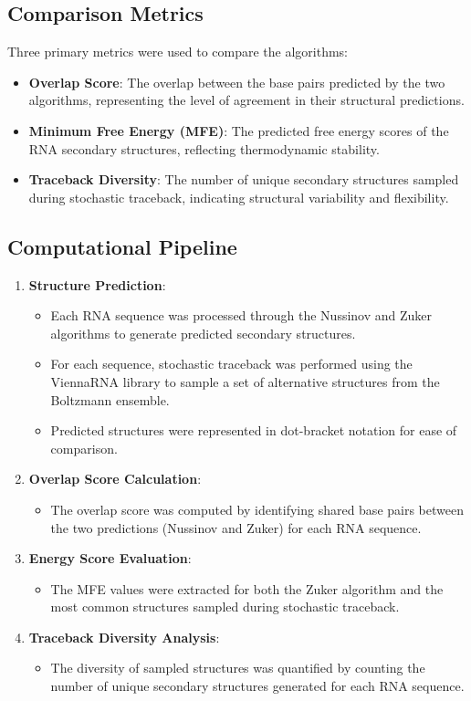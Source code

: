 \documentclass[10pt]{wlscirep}
\begin{document}
\subsection{Comparison Metrics}

Three primary metrics were used to compare the algorithms:
\begin{itemize}
\item \textbf{Overlap Score}: The overlap between the base pairs predicted by the two algorithms, representing the level of agreement in their structural predictions.
\item \textbf{Minimum Free Energy (MFE)}: The predicted free energy scores of the RNA secondary structures, reflecting thermodynamic stability.
\item \textbf{Traceback Diversity}: The number of unique secondary structures sampled during stochastic traceback, indicating structural variability and flexibility.
\end{itemize}

\subsection{Computational Pipeline}

\begin{enumerate}
\item \textbf{Structure Prediction}:
\begin{itemize}
\item Each RNA sequence was processed through the Nussinov and Zuker algorithms to generate predicted secondary structures.
\item For each sequence, stochastic traceback was performed using the ViennaRNA library to sample a set of alternative structures from the Boltzmann ensemble.
\item Predicted structures were represented in dot-bracket notation for ease of comparison.
\end{itemize}
\item \textbf{Overlap Score Calculation}:
\begin{itemize}
\item The overlap score was computed by identifying shared base pairs between the two predictions (Nussinov and Zuker) for each RNA sequence.
\end{itemize}
\item \textbf{Energy Score Evaluation}:
\begin{itemize}
\item The MFE values were extracted for both the Zuker algorithm and the most common structures sampled during stochastic traceback.
\end{itemize}
\item \textbf{Traceback Diversity Analysis}:
\begin{itemize}
\item The diversity of sampled structures was quantified by counting the number of unique secondary structures generated for each RNA sequence.
\end{itemize}
\end{enumerate}
\end{document}
